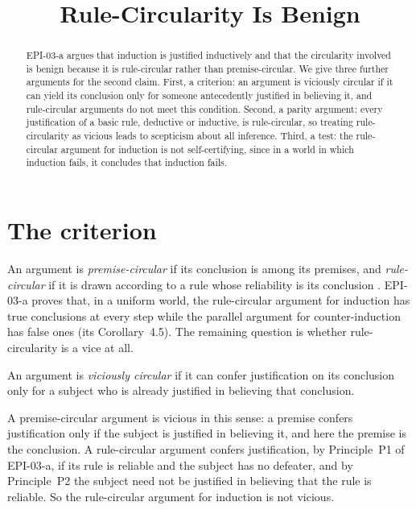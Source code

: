 \documentclass{situationist-preprint}
\title{Rule-Circularity Is Benign}
\begin{document}
\maketitle

\begin{abstract}
EPI-03-a argues that induction is justified inductively and that the circularity involved is benign because it is rule-circular rather than premise-circular. We give three further arguments for the second claim. First, a criterion: an argument is viciously circular if it can yield its conclusion only for someone antecedently justified in believing it, and rule-circular arguments do not meet this condition. Second, a parity argument: every justification of a basic rule, deductive or inductive, is rule-circular, so treating rule-circularity as vicious leads to scepticism about all inference. Third, a test: the rule-circular argument for induction is not self-certifying, since in a world in which induction fails, it concludes that induction fails.
\end{abstract}

\section{The criterion}

An argument is \emph{premise-circular} if its conclusion is among its premises, and \emph{rule-circular} if it is drawn according to a rule whose reliability is its conclusion \citep{VanCleve1984}. EPI-03-a proves that, in a uniform world, the rule-circular argument for induction has true conclusions at every step while the parallel argument for counter-induction has false ones (its Corollary~4.5). The remaining question is whether rule-circularity is a vice at all.

\begin{definition}\label{d:vicious}
An argument is \emph{viciously circular} if it can confer justification on its conclusion only for a subject who is already justified in believing that conclusion.
\end{definition}

A premise-circular argument is vicious in this sense: a premise confers justification only if the subject is justified in believing it, and here the premise is the conclusion. A rule-circular argument confers justification, by Principle~P1 of EPI-03-a, if its rule is reliable and the subject has no defeater, and by Principle~P2 the subject need not be justified in believing that the rule is reliable. So the rule-circular argument for induction is not vicious.
\end{document}
